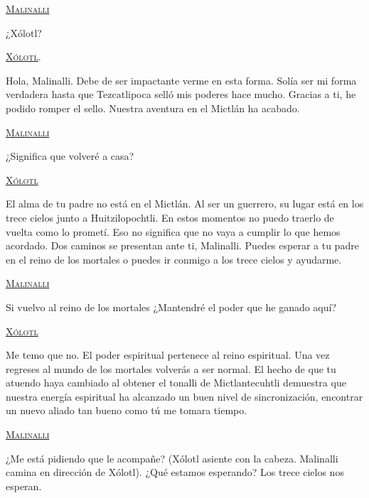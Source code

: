 \documentclass[11pt,letterpaper]{article}
\begin{document}
\begin{center}
\textsc{\underline{Malinalli}}
\\
\par 
¿Xólotl?
\\
\par 
\textsc{\underline{Xólotl}}.
\\
\par 
Hola, Malinalli. Debe de ser impactante verme en esta forma. Solía ser mi forma verdadera hasta que Tezcatlipoca selló mis poderes hace mucho. Gracias a ti, he podido romper el sello. Nuestra aventura en el Mictlán ha acabado.
\\
\par 
\textsc{\underline{Malinalli}}
\\
\par 
¿Significa que volveré a casa?  
\\
\par 
\textsc{\underline{Xólotl}}
\\
\par 
El alma de tu padre no está en el Mictlán. Al ser un guerrero, su lugar está en los trece cielos junto a Huitzilopochtli. En estos momentos no puedo traerlo de vuelta como lo prometí. Eso no significa que no vaya a cumplir lo que hemos acordado. Dos caminos se presentan ante ti, Malinalli. Puedes esperar a tu padre en el reino de los mortales o puedes ir conmigo a los trece cielos y ayudarme. 
\\
\par 
\textsc{\underline{Malinalli}}
\\
\par 
Si vuelvo al reino de los mortales ¿Mantendré el poder que he ganado aquí?
\\
\par 
\textsc{\underline{Xólotl}}
\\
\par 
Me temo que no. El poder espiritual pertenece al reino espiritual. Una vez regreses al mundo de los mortales volverás a ser normal. El hecho de que tu atuendo haya cambiado al obtener el tonalli de Mictlantecuhtli demuestra que nuestra energía espiritual ha alcanzado un buen nivel de sincronización, encontrar un nuevo aliado tan bueno como tú me tomara tiempo.
\\
\par 
\textsc{\underline{Malinalli}}
\\
\par 
¿Me está pidiendo que le acompañe? (Xólotl asiente con la cabeza. Malinalli camina en dirección de Xólotl). ¿Qué estamos esperando? Los trece cielos nos esperan. 
\end{center}
\end{document}

